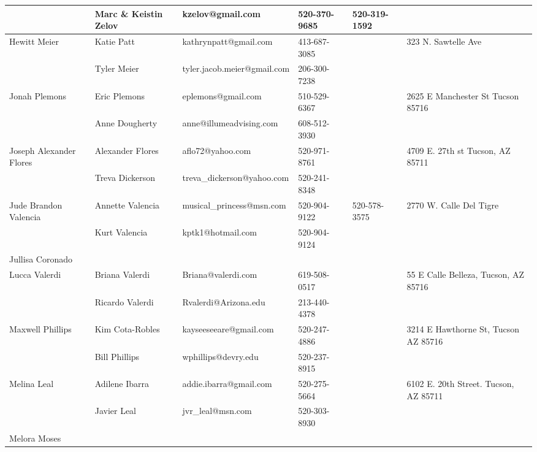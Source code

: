 \documentclass[landscape]{article}\usepackage[]{graphicx}\usepackage[]{color}
\begin{document}
\begin{longtable}{|p{100pt}|p{100pt}|p{140pt}|p{60pt}|p{64pt}|p{120pt}|}
 & Marc \& Keistin Zelov & kzelov@gmail.com & 520-370-9685 & 520-319-1592 & \\
\hline
\multirow{2}{100pt}{Hewitt Meier} & Katie Patt & kathrynpatt@gmail.com & 413-687-3085 &  & \multirow{2}{120pt}{323 N. Sawtelle Ave} \\
 & Tyler Meier & tyler.jacob.meier@gmail.com & 206-300-7238 &  & \\
\hline
\multirow{2}{100pt}{Jonah Plemons} & Eric Plemons & eplemons@gmail.com & 510-529-6367 &  & \multirow{2}{120pt}{2625 E Manchester St Tucson 85716} \\
 & Anne Dougherty & anne@illumeadvising.com & 608-512-3930 &  & \\
\hline
\multirow{2}{100pt}{Joseph Alexander Flores} & Alexander Flores & aflo72@yahoo.com & 520-971-8761 &  & \multirow{2}{120pt}{4709 E. 27th st Tucson, AZ 85711} \\
 & Treva Dickerson & treva\_dickerson@yahoo.com & 520-241-8348 &  & \\
\hline
\multirow{2}{100pt}{Jude Brandon Valencia} & Annette Valencia & musical\_princess@msn.com & 520-904-9122 & 520-578-3575 & \multirow{2}{120pt}{2770 W. Calle Del Tigre} \\
 & Kurt Valencia & kptk1@hotmail.com & 520-904-9124 &  & \\
\hline
\multirow{2}{100pt}{Jullisa Coronado} &  &  &  &  & \multirow{2}{120pt}{} \\
 &  &  &  &  & \\
\hline
\multirow{2}{100pt}{Lucca Valerdi} & Briana Valerdi & Briana@valerdi.com & 619-508-0517 &  & \multirow{2}{120pt}{55 E Calle Belleza, Tucson, AZ 85716} \\
 & Ricardo Valerdi & Rvalerdi@Arizona.edu & 213-440-4378 &  & \\
\hline
\multirow{2}{100pt}{Maxwell Phillips} & Kim Cota-Robles & kayseeseeare@gmail.com & 520-247-4886 &  & \multirow{2}{120pt}{3214 E Hawthorne St, Tucson AZ 85716} \\
 & Bill Phillips & wphillips@devry.edu & 520-237-8915 &  & \\
\hline
\multirow{2}{100pt}{Melina Leal} & Adilene Ibarra & addie.ibarra@gmail.com & 520-275-5664 &  & \multirow{2}{120pt}{6102 E. 20th Street. Tucson, AZ 85711} \\
 & Javier Leal & jvr\_leal@msn.com & 520-303-8930 &  & \\
\hline
\multirow{2}{100pt}{Melora Moses} &  &  &  &  & \multirow{2}{120pt}{} \\
 &  &  &  &  & \\

\end{longtable}
\end{document}
